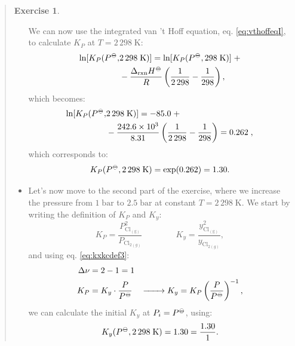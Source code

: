 \documentclass[
  9pt,
]{extbook}
\theoremstyle{definition}
\theoremstyle{definition}
\theoremstyle{definition}
\newtheorem{exercise}{Exercise}[chapter]
\theoremstyle{remark}
\begin{document}
\begin{quote}
\begin{exercise}
\begin{itemize}
  We can now use the integrated van 't Hoff equation, eq. \eqref{eq:vthoffeqI}, to calculate \(K_P\) at \(T=2\,298\;\text{K}\):
  \begin{equation}
  \begin{aligned}
  \ln [K_P (P^{-\kern-6pt{\ominus}\kern-6pt-},&2\,298\;\text{K})] = \ln [K_P (P^{-\kern-6pt{\ominus}\kern-6pt-},298\;\text{K})] \;+ \\ &-\frac{\Delta_{\text{rxn}} H^{-\kern-6pt{\ominus}\kern-6pt-}}{R} \left(\frac{1}{2\,298}-\frac{1}{298} \right),
  \end{aligned}
  \end{equation}
  which becomes:
  \begin{equation}
  \begin{aligned}
  \ln [K_P (P^{-\kern-6pt{\ominus}\kern-6pt-},&2\,298\;\text{K})] = - 85.0 \;+\\&-\frac{242.6\times 10^{3}}{8.31} \left(\frac{1}{2\,298}-\frac{1}{298} \right) = 0.262\;,
  \end{aligned}
  \end{equation}
  which corresponds to:
  \begin{equation}
  K_P (P^{-\kern-6pt{\ominus}\kern-6pt-},2\,298\;\text{K}) = \exp (0.262)=1.30.
  \end{equation}
\item
  Let's now move to the second part of the exercise, where we increase the pressure from \(1\;\text{bar}\) to \(2.5\;\text{bar}\) at constant \(T=2\,298\;\text{K}\). We start by writing the definition of \(K_P\) and \(K_y\):
  \begin{equation}
  K_P=\frac{P_\mathrm{Cl_{(g)}}^2}{P_{\mathrm{Cl}_{2(g)}}} \qquad \qquad  K_y=\frac{y_\mathrm{Cl_{(g)}}^2}{y_{\mathrm{Cl}_{2(g)}}},
  \end{equation}
  and using eq. \eqref{eq:kxkcdef3}:
  \begin{equation}
  \begin{aligned}
  \Delta \nu &= 2 - 1 = 1 \\
  K_P &= K_y \cdot \frac{P}{P^{-\kern-6pt{\ominus}\kern-6pt-}} \quad \xrightarrow \qquad K_y=K_P \left( \frac{P}{P^{-\kern-6pt{\ominus}\kern-6pt-}} \right)^{-1},
  \end{aligned}
  \end{equation}
  we can calculate the initial \(K_y\) at \(P_i=P^{-\kern-6pt{\ominus}\kern-6pt-}\), using:
  \begin{equation}
  K_y (P^{-\kern-6pt{\ominus}\kern-6pt-},2\,298\;\text{K}) = 1.30 =\frac{1.30}{1}.
  \end{equation}

\end{itemize}
\end{exercise}
\end{quote}
\end{document}
